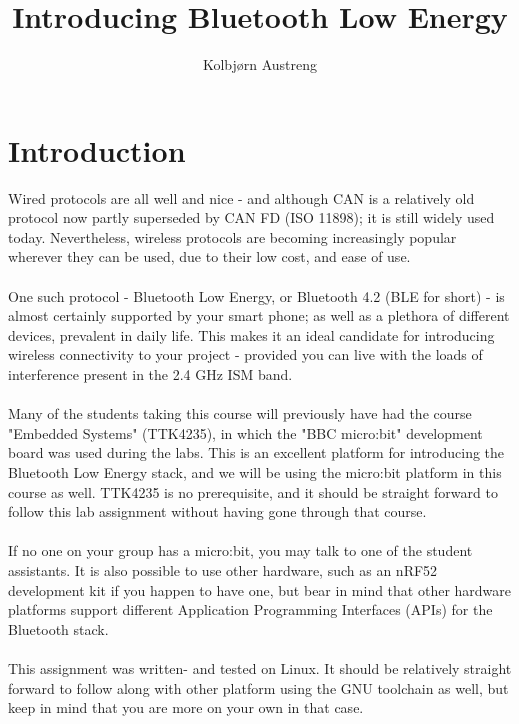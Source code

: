 \documentclass[11pt,a4paper]{article}
\title{Introducing Bluetooth Low Energy}
\author{Kolbjørn Austreng}
\date{}
\begin{document}
\maketitle

\renewcommand{\thesection}{\roman{section}}
\renewcommand{\thesubsection}{\roman{section}.\alph{subsection}}

\section{Introduction}
Wired protocols are all well and nice - and although CAN is a relatively old protocol now partly superseded by CAN FD (ISO 11898); it is still widely used today. Nevertheless, wireless protocols are becoming increasingly popular wherever they can be used, due to their low cost, and ease of use.\\
\\
One such protocol - Bluetooth Low Energy, or Bluetooth 4.2 (BLE for short) - is almost certainly supported by your smart phone; as well as a plethora of different devices, prevalent in daily life. This makes it an ideal candidate for introducing wireless connectivity to your project - provided you can live with the loads of interference present in the 2.4 GHz ISM band.\\
\\
Many of the students taking this course will previously have had the course "Embedded Systems" (TTK4235), in which the "BBC micro:bit" development board was used during the labs. This is an excellent platform for introducing the Bluetooth Low Energy stack, and we will be using the micro:bit platform in this course as well. TTK4235 is no prerequisite, and it should be straight forward to follow this lab assignment without having gone through that course.\\
\\
If no one on your group has a micro:bit, you may talk to one of the student assistants. It is also possible to use other hardware, such as an nRF52 development kit if you happen to have one, but bear in mind that other hardware platforms support different Application Programming Interfaces (APIs) for the Bluetooth stack.\\
\\
This assignment was written- and tested on Linux. It should be relatively straight forward to follow along with other platform using the GNU toolchain as well, but keep in mind that you are more on your own in that case.

\newpage
\noindent
\end{document}
